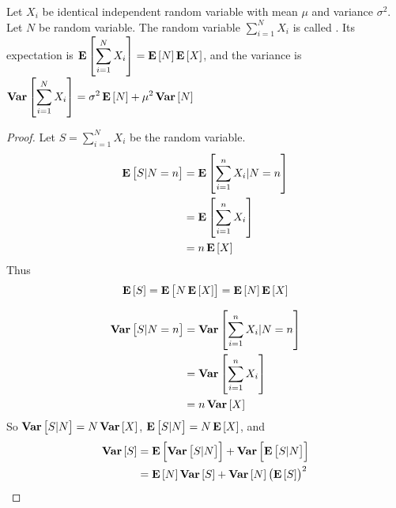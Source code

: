 \begin{example}
    Let $X_i$ be identical independent random variable with mean $\mu$ and variance $\sigma^2$. Let $N$ be random variable. The random variable $\displaystyle \sum_{i=1}^N X_i$ is called . Its expectation is $\displaystyle \expect{\sum_{i=1}^N X_i} = \expect{N} \expect{X}$, and the variance is $\variance{\sum_{i=1}^N X_i} = \sigma^2 \expect{N} + \mu^2 \variance{N}$
\end{example}
\begin{proof}
    Let $\displaystyle S = \sum_{i=1}^N X_i $  be the random variable. 
    \begin{equation*}
        \begin{aligned}
            \displaystyle \expect{S| N = n} &= \expect{\sum_{i=1}^n X_i | N = n} \\
            &= \expect{\sum_{i=1}^n X_i} \\
            &= n \expect{X}
        \end{aligned}
    \end{equation*}
    Thus
    \begin{equation*}
        \expect{S} = \expect{N \expect{X}} = \expect{N} \expect{X}
    \end{equation*}
    
    \begin{equation*}
        \begin{aligned}
            \displaystyle \variance{S|N=n} &= \variance{\sum_{i=1}^n X_i | N = n} \\
            &= \variance{\sum_{i=1}^n X_i} \\
            &= n \variance{X}
        \end{aligned}
    \end{equation*}
    So $\variance{S|N} = N \variance{X}$, $\expect{S|N} = N \expect{X}$, and
    \begin{equation*}
        \begin{aligned}
            \variance{S} &= \expect{\variance{S|N}} + \variance{\expect{S|N}} \\
            &= \expect{N} \variance{S} + \variance{N}\left(\expect{S}\right)^2
        \end{aligned}
    \end{equation*}
\end{proof}

